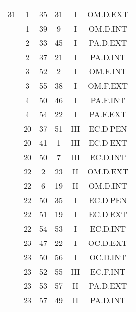 \documentclass[12pt, a4paper]{article}
\begin{document}
\begin{multicols}{3}
{\begin{tabular}{c c c c c c}
	 	 	 	 & & & & & \\%
	 	 	 	31 & 1 & 35 & 31 & I & OM.D.EXT\\%
	 	 	 	 & 1 & 39 & 9 & I & OM.D.INT\\%
	 	 	 	 & 2 & 33 & 45 & I & PA.D.EXT\\%
	 	 	 	 & 2 & 37 & 21 & I & PA.D.INT\\%
	 	 	 	 & 3 & 52 & 2 & I & OM.F.INT\\%
	 	 	 	 & 3 & 55 & 38 & I & OM.F.EXT\\%
	 	 	 	 & 4 & 50 & 46 & I & PA.F.INT\\%
	 	 	 	 & 4 & 54 & 22 & I & PA.F.EXT\\%
	 	 	 	 & 20 & 37 & 51 & III & EC.D.PEN\\%
	 	 	 	 & 20 & 41 & 1 & III & EC.D.EXT\\%
	 	 	 	 & 20 & 50 & 7 & III & EC.D.INT\\%
	 	 	 	 & 22 & 2 & 23 & II & OM.D.EXT\\%
	 	 	 	 & 22 & 6 & 19 & II & OM.D.INT\\%
	 	 	 	 & 22 & 50 & 35 & I & EC.D.PEN\\%
	 	 	 	 & 22 & 51 & 19 & I & EC.D.EXT\\%
	 	 	 	 & 22 & 54 & 53 & I & EC.D.INT\\%
	 	 	 	 & 23 & 47 & 22 & I & OC.D.EXT\\%
	 	 	 	 & 23 & 50 & 56 & I & OC.D.INT\\%
	 	 	 	 & 23 & 52 & 55 & III & EC.F.INT\\%
	 	 	 	 & 23 & 53 & 57 & II & PA.D.EXT\\%
	 	 	 	 & 23 & 57 & 49 & II & PA.D.INT\\%
	 	 \end{tabular}
 	}
\end{multicols}
\end{document}
